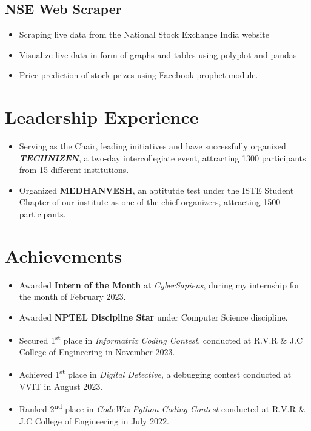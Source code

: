 \documentclass[]{roshan-resume}
\begin{document}
\begin{minipage}[t]{0.66\textwidth}
		\subsection{NSE Web Scraper}
		\begin{itemize}
			\item Scraping live data from the National Stock Exchange India website
			\item Visualize live data in form of graphs and tables using polyplot and pandas
			\item Price prediction of stock prizes using Facebook prophet module.
		\end{itemize}
		
		\section{Leadership Experience}
		\begin{itemize}
			\item Serving as the Chair, leading initiatives and have successfully organized \textbf{\textit{TECHNIZEN}}, a two-day intercollegiate event, attracting 1300 participants from 15 different institutions.
			\item Organized \textbf{MEDHANVESH}, an aptitutde test under the ISTE Student Chapter of our institute as one of the chief organizers, attracting 1500 participants.
		\end{itemize}
		
		
		\section{Achievements} 
		\begin{itemize}
			\item Awarded \textbf{Intern of the Month} at \textit{CyberSapiens}, during my internship for the month of February 2023.
			\item Awarded \textbf{NPTEL Discipline Star} under Computer Science discipline.
			\item Secured 1\textsuperscript{st} place in \textit{Informatrix Coding Contest}, conducted at R.V.R \& J.C College of Engineering in November 2023.
			\item Achieved 1\textsuperscript{st} place in \textit{Digital Detective}, a debugging contest conducted at VVIT in August 2023.
			\item Ranked 2\textsuperscript{nd} place in \textit{CodeWiz Python Coding Contest} conducted at R.V.R \& J.C College of Engineering in July 2022.
		\end{itemize}
		

\end{minipage}
\end{document}
